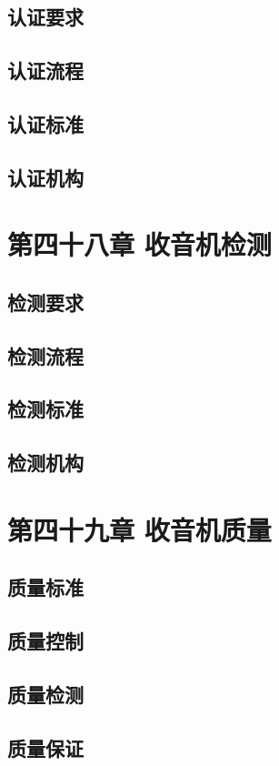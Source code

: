 \documentclass[12pt,UTF8]{ctexbook}
\begin{document}
\section{认证要求}
\section{认证流程}
\section{认证标准}
\section{认证机构}

\chapter{第四十八章 收音机检测}

\section{检测要求}
\section{检测流程}
\section{检测标准}
\section{检测机构}

\chapter{第四十九章 收音机质量}

\section{质量标准}
\section{质量控制}
\section{质量检测}
\section{质量保证}
\end{document}
